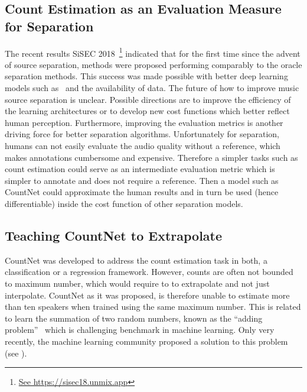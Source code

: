 \subsection*{Count Estimation as an Evaluation Measure for Separation}

The recent results SiSEC 2018~\cite{stoeter18sisec}\footnote{\url{See https://sisec18.unmix.app}} indicated that for the first time since the advent of source separation, methods were proposed performing comparably to the oracle separation methods.
This success was made possible with better deep learning models such as~\cite{takahashi17} and the availability of data. 
The future of how to improve music source separation is unclear. Possible directions are to improve the efficiency of the learning architectures or to develop new cost functions which better reflect human perception.
Furthermore, improving the evaluation metrics is another driving force for better separation algorithms. Unfortunately for separation, humans can not easily evaluate the audio quality without a reference, which makes annotations cumbersome and expensive. 
Therefore a simpler tasks such as count estimation could serve as an intermediate evaluation metric which is simpler to annotate and does not require a reference. Then a model such as CountNet could approximate the human results and in turn be used (hence differentiable) inside the cost function of other separation models.

\subsection*{Teaching CountNet to Extrapolate}

CountNet was developed to address the count estimation task in both, a classification or a regression framework. 
However, counts are often not bounded to maximum number, which would require to  to extrapolate and not just interpolate.
CountNet as it was proposed, is therefore unable to estimate more than ten speakers when trained using the same maximum number. 
This is related to learn the summation of two random numbers, known as the ``adding problem''~\cite{Hochreiter97} which is challenging benchmark in machine learning. 
Only very recently, the machine learning community proposed a solution to this problem (see \cite{trask18}).


